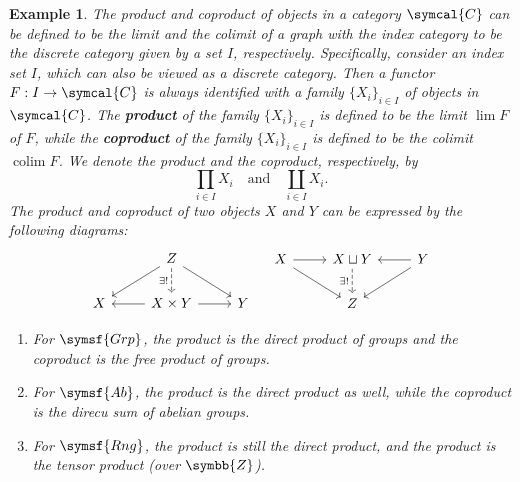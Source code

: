 \documentclass{article}
\theoremstyle{theorem}
\newtheorem{example}{Example}[section]
\theoremstyle{remark}
\def\calC{{\symcal{C}}}
\DeclareMathOperator*{\colim}{colim}
\begin{document}
\begin{example}
    The product and coproduct of objects in a category $\calC$ can be defined to be the limit and the colimit of a graph with the index category to be the discrete category given by a set $I$, respectively. Specifically, consider an index set $I$, which can also be viewed as a discrete category. Then a functor $F : I \to \calC$ is always identified with a family $\{X_i\}_{i \in I}$ of objects in $\calC$. The \textbf{product} of the family $\{X_i\}_{i \in I}$ is defined to be the limit $\lim F$ of $F$, while the \textbf{coproduct} of the family $\{X_i\}_{i \in I}$ is defined to be the colimit $\colim F$. We denote the product and the coproduct, respectively, by $$\prod_{i \in I} X_i \quad \text{and} \quad \coprod_{i \in I} X_i.$$ The product and coproduct of two objects $X$ and $Y$ can be expressed by the following diagrams:
    $$\begin{tikzcd}
        & Z \\
        X & {X  \times Y} & Y
        \arrow[from=1-2, to=2-1]
        \arrow["{\exists !}"', dashed, from=1-2, to=2-2]
        \arrow[from=1-2, to=2-3]
        \arrow[from=2-2, to=2-1]
        \arrow[from=2-2, to=2-3]
    \end{tikzcd}
    \quad
    \begin{tikzcd}
        X & {X \sqcup Y} & Y \\
        & Z
        \arrow[from=1-1, to=1-2]
        \arrow[from=1-1, to=2-2]
        \arrow["{\exists !}"', dashed, from=1-2, to=2-2]
        \arrow[from=1-3, to=1-2]
        \arrow[from=1-3, to=2-2]
    \end{tikzcd}$$
    \begin{enumerate}
        \item For $\symsf{Grp}$, the product is the direct product of groups and the coproduct is the free product of groups. 
        \item For $\symsf{Ab}$, the product is the direct product as well, while the coproduct is the direcu sum of abelian groups. 
        \item For $\symsf{Rng}$, the product is still the direct product, and the product is the tensor product (over $\symbb{Z}$). 
    \end{enumerate}
\end{example}
\end{document}
